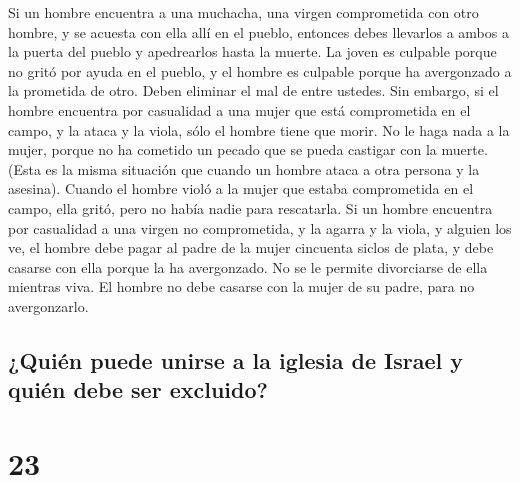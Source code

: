  Si un hombre encuentra a una muchacha, una virgen
comprometida con otro hombre, y se acuesta con ella allí en el pueblo,
 entonces debes llevarlos a ambos a la puerta del pueblo
y apedrearlos hasta la muerte. La joven es culpable porque no gritó por
ayuda en el pueblo, y el hombre es culpable porque ha avergonzado a la
prometida de otro. Deben eliminar el mal de entre ustedes.
 Sin embargo, si el hombre encuentra por casualidad a una
mujer que está comprometida en el campo, y la ataca y la viola, sólo el
hombre tiene que morir.  No le haga nada a la mujer,
porque no ha cometido un pecado que se pueda castigar con la muerte.
(Esta es la misma situación que cuando un hombre ataca a otra persona y
la asesina).  Cuando el hombre violó a la mujer que
estaba comprometida en el campo, ella gritó, pero no había nadie para
rescatarla.  Si un hombre encuentra por casualidad a una
virgen no comprometida, y la agarra y la viola, y alguien los ve,
 el hombre debe pagar al padre de la mujer cincuenta
siclos de plata, y debe casarse con ella porque la ha avergonzado. No se
le permite divorciarse de ella mientras viva.  El hombre
no debe casarse con la mujer de su padre, para no avergonzarlo.

\hypertarget{quiuxe9n-puede-unirse-a-la-iglesia-de-israel-y-quiuxe9n-debe-ser-excluido}{%
\subsection{¿Quién puede unirse a la iglesia de Israel y quién debe ser
excluido?}\label{quiuxe9n-puede-unirse-a-la-iglesia-de-israel-y-quiuxe9n-debe-ser-excluido}}

\hypertarget{section-22}{%
\section{23}\label{section-22}}

